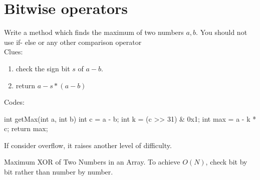 \section{Bitwise operators}
 Write a method which finds the maximum of two numbers $a, b$. You should not use if- else or any other comparison operator
\\
Clues:
\begin{enumerate}
\item check the sign bit $s$ of $a-b$.
\item return $a-s*(a-b)$
\end{enumerate}
Codes:
\begin{java}
int getMax(int a, int b) { 
    int c = a - b;
    int k = (c >> 31) & 0x1; 
    int max = a - k * c; 
    return max;
}

\end{java}
If consider overflow, it raises another level of difficulty. 

 Maximum XOR of Two Numbers in an Array. To achieve $O(N)$, check bit by bit rather than number by number.
